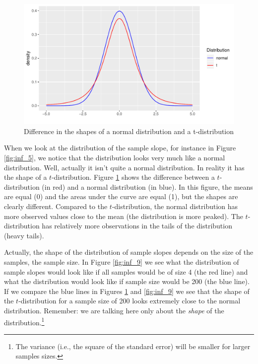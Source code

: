 \documentclass[]{report}\usepackage[]{graphicx}\usepackage[]{color}
\makeatletter
\def\maxwidth{ %
  \ifdim\Gin@nat@width>\linewidth
    \linewidth
  \else
    \Gin@nat@width
  \fi
}
\newenvironment{knitrout}{}{} %
\makeatother
\begin{document}
\begin{knitrout}
\color{fgcolor}\begin{figure}

{\centering \includegraphics[width=\maxwidth]{figure/inf_8-1} 

}

\caption[Difference in the shapes of a normal distribution and a t-distribution]{Difference in the shapes of a normal distribution and a t-distribution}\label{fig:inf_8}
\end{figure}


\end{knitrout}



When we look at the distribution of the sample slope, for instance in Figure \ref{fig:inf_5}, we notice that the distribution looks very much like a normal distribution. Well, actually it isn't quite a normal distribution. In reality it has the shape of a $t$-distribution. Figure \ref{fig:inf_8} shows the difference between a $t$-distribution (in red) and a normal distribution (in blue). In this figure, the means are equal (0) and the areas under the curve are equal (1), but the shapes are clearly different. Compared to the $t$-distribution, the normal distribution has more observed values close to the mean (the distribution is more peaked). The $t$-distribution has relatively more observations in the tails of the distribution (heavy tails).



Actually, the shape of the distribution of sample slopes depends on the size of the samples, the sample size. In Figure \ref{fig:inf_9} we see what the distribution of sample slopes would look like if all samples would be of size 4 (the red line) and what the distribution would look like if sample size would be 200 (the blue line). If we compare the blue lines in Figures \ref{fig:inf_8} and \ref{fig:inf_9} we see that the shape of the $t$-distribution for a sample size of 200 looks extremely close to the normal distribution. Remember: we are talking here only about the \textit{shape} of the distribution.\footnote{The variance (i.e., the square of the standard error) will be smaller for larger samples sizes.} 
\end{document}
